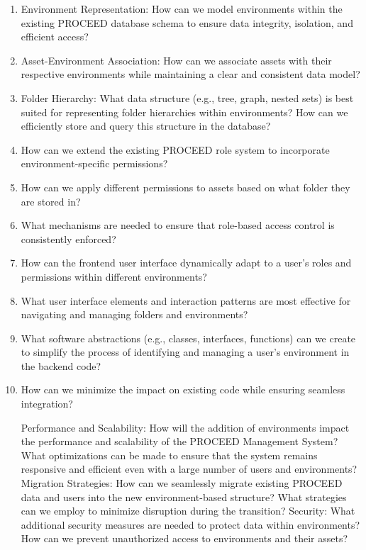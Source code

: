 \begin{enumerate}

\item Environment Representation: How can we model environments within the existing PROCEED database schema to ensure data integrity, isolation, and efficient access? 

\item Asset-Environment Association: How can we associate assets with their respective environments while maintaining a clear and consistent data model?

\item Folder Hierarchy: What data structure (e.g., tree, graph, nested sets) is best suited for representing folder hierarchies within environments? How can we efficiently store and query this structure in the database?


\item How can we extend the existing PROCEED role system to incorporate
environment-specific permissions? 

\item How can we apply different permissions to assets based on what folder they are
  stored in?

\item What mechanisms are needed to ensure that role-based access control is consistently enforced?

\item How can the frontend user interface dynamically adapt to a user's roles and permissions within different environments?


\item What user interface elements and interaction patterns are most effective for navigating and managing folders and environments?

\item What software abstractions (e.g., classes, interfaces, functions) can we create to simplify the process of identifying and managing a user's environment in the backend code? 

\item How can we minimize the impact on existing code while ensuring seamless integration?


Performance and Scalability: How will the addition of environments impact the performance and scalability of the PROCEED Management System? What optimizations can be made to ensure that the system remains responsive and efficient even with a large number of users and environments?
Migration Strategies: How can we seamlessly migrate existing PROCEED data and users into the new environment-based structure? What strategies can we employ to minimize disruption during the transition?
Security: What additional security measures are needed to protect data within environments? How can we prevent unauthorized access to environments and their assets?
\end{enumerate}

